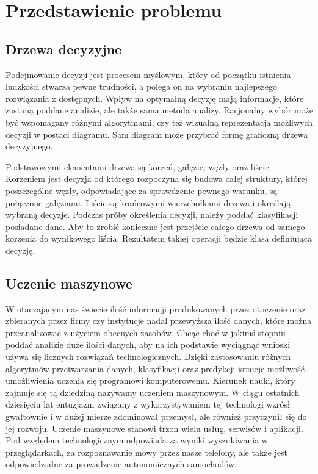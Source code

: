 \chapter{Przedstawienie problemu}

\section{Drzewa decyzyjne}

Podejmowanie decyzji jest procesem myślowym, który od początku istnienia ludzkości stwarza pewne trudności, a polega on na wybraniu najlepszego rozwiązania z dostępnych. Wpływ na optymalną decyzję mają informacje, które zostaną poddane analizie, ale także sama metoda analizy. Racjonalny wybór może być wspomagany różnymi algorytmami, czy też wizualną reprezentacją możliwych decyzji w postaci diagramu. Sam diagram może przybrać formę graficzną drzewa decyzyjnego.

Podstawowymi elementami drzewa są korzeń, gałęzie, węzły oraz liście. Korzeniem jest decyzja od którego rozpoczyna się budowa całej struktury, której poszczególne węzły, odpowiadające za sprawdzenie pewnego warunku, są połączone gałęziami.\cite{misc_1}  Liście są krańcowymi wierzchołkami drzewa i określają wybraną decyzje. Podczas próby określenia decyzji, należy poddać klasyfikacji posiadane dane. Aby to zrobić konieczne jest przejście całego drzewa od samego korzenia do wynikowego liścia. Rezultatem takiej operacji będzie klasa definiująca decyzję.

\section{Uczenie maszynowe}
W otaczającym nas świecie ilość informacji produkowanych przez otoczenie oraz zbieranych przez firmy czy instytucje nadal przewyższa ilość danych, które można przeanalizować z użyciem obecnych zasobów. Chcąc choć w jakimś stopniu poddać analizie duże ilości danych, aby na ich podstawie wyciągnąć wnioski używa się licznych rozwiązań technologicznych. Dzięki zastosowaniu różnych algorytmów przetwarzania danych, klasyfikacji oraz predykcji istnieje możliwość umożliwienia uczenia się programowi komputerowemu. Kierunek nauki, który zajmuje się tą dziedziną nazywamy uczeniem maszynowym. W ciągu ostatnich dziesięciu lat entuzjazm związany z wykorzystywaniem tej technologi wzrósł gwałtownie i w dużej mierze 
zdominował przemysł, ale również przyczynił się do jej rozwoju.\cite{book_1} Uczenie maszynowe stanowi trzon wielu usług, serwisów i aplikacji. Pod względem technologicznym odpowiada za wyniki wyszukiwania w przeglądarkach, za rozpoznawanie mowy przez nasze telefony, ale także jest odpowiedzialne za prowadzenie autonomicznych samochodów.

